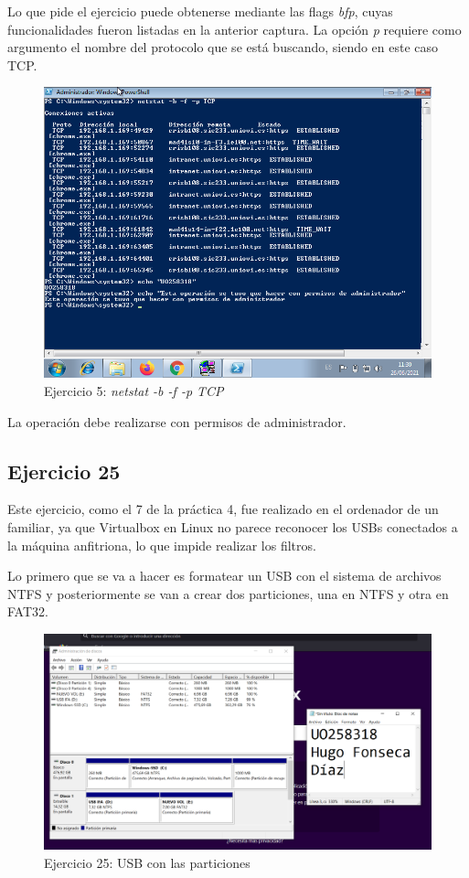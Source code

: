 \documentclass[11pt]{article}
\begin{document}
Lo que pide el ejercicio puede obtenerse mediante las flags \textit{bfp}, cuyas funcionalidades fueron listadas en la anterior captura. La opción \textit{p} requiere como argumento el nombre del protocolo que se está buscando, siendo en este caso TCP.

\begin{figure}[H]
    \caption{Ejercicio 5: \textit{netstat -b -f -p TCP}}
  \centering
    \includegraphics[scale=0.7]{p05/e5-7.png}
\end{figure}

La operación debe realizarse con permisos de administrador.

\subsection{Ejercicio 25}
Este ejercicio, como el 7 de la práctica 4, fue realizado en el ordenador de un familiar, ya que Virtualbox en Linux no parece reconocer los USBs conectados a la máquina anfitriona, lo que impide realizar los filtros.

Lo primero que se va a hacer es formatear un USB con el sistema de archivos NTFS y posteriormente se van a crear dos particiones, una en NTFS y otra en FAT32.

\begin{figure}[H]
    \caption{Ejercicio 25: USB con las particiones}
  \centering
    \includegraphics[scale=0.4]{p05/e25-1.PNG}
\end{figure}
\end{document}
